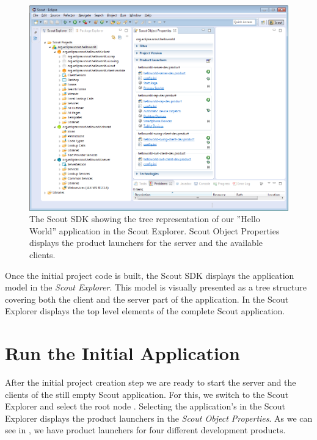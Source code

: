 \documentclass[a4paper,10pt,twoside]{book}
\begin{document}
\begin{figure}
\includegraphics[width=14cm]{sdk_initial_helloworld_project.png}
\caption{The Scout SDK showing the tree representation of our ''Hello World'' application in the Scout Explorer.
Scout Object Properties displays the product launchers for the server and the available clients.}
\end{figure}

Once the initial project code is built, the Scout SDK displays the application model in the \textit{Scout Explorer}.
This model is visually presented as a tree structure covering both the client and the server part of the application.
In  the Scout Explorer displays the top level elements of the complete Scout application.

\section{Run the Initial Application}

After the initial project creation step we are ready to start the server and the clients of the still empty Scout application.
For this, we switch to the Scout Explorer and select the root node .
Selecting the application's  in the Scout Explorer displays the product launchers in the \textit{Scout Object Properties}.
As we can see in , we have product launchers for four different development products.
\end{document}
